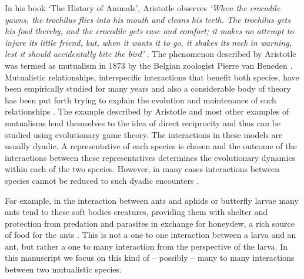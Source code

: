 \documentclass[a4paper]{scrartcl}
\begin{document}
In his book `The History of Animals', Aristotle observes
{\em
`When the crocodile yawns, the trochilus flies into his mouth and cleans
his teeth. The trochilus gets his food thereby, and the crocodile
gets ease and comfort; it makes no attempt to injure its little friend,
but, when it wants it to go, it shakes its neck in warning, lest it
should accidentally bite the bird'} \citep{aristotle:350bc}.
The phenomenon described by Aristotle was termed as mutualism in $1873$ by the Belgian zoologist Pierre van Beneden \citep{bronstein:2003bo}.
Mutualistic relationships, interspecific interactions that benefit both species, have been empirically studied for many years \citep{boucher:1985aa,hinton:1951aa,wilson:1983an,bronstein:1994aa,pierce:2002aa,kiers:2003aa,bshary:2003bo} and also a considerable body of theory has been put forth trying to explain the evolution and maintenance of such relationships \citep{poulin:1995aa,doebeli:1998aa,noe:2001aa,johnstone:2002aa,bergstrom:2003jf,hoeksema:2003aa,akcay:2007aa,bshary:2008aa}.
The example described by Aristotle and most other examples of mutualisms lend themselves to the idea of direct reciprocity \citep{trivers:1971hp} and thus can be studied using evolutionary game theory.
The interactions in these models are usually dyadic.
A representative of each species is chosen and the outcome of the interactions between these representatives 
determines the evolutionary dynamics within each of the two species.
However, in many cases interactions between species cannot be reduced to such dyadic encounters \citep{stadler:2008bo}.

For example, in the interaction between ants and aphids or butterfly larvae \citep{pierce:1987aa,holldobler:1990an} many ants tend to these soft bodies creatures, providing them with shelter and protection from predation and parasites in exchange for honeydew, a rich source of food for the ants \citep{hill:1989aa,stadler:2008bo}.
This is not a one to one interaction between a larva and an ant, but rather a one to many interaction from the perspective of the larva.
In this manuscript we focus on this kind of -- possibly -- many to many interactions between two mutualistic species.
\end{document}
